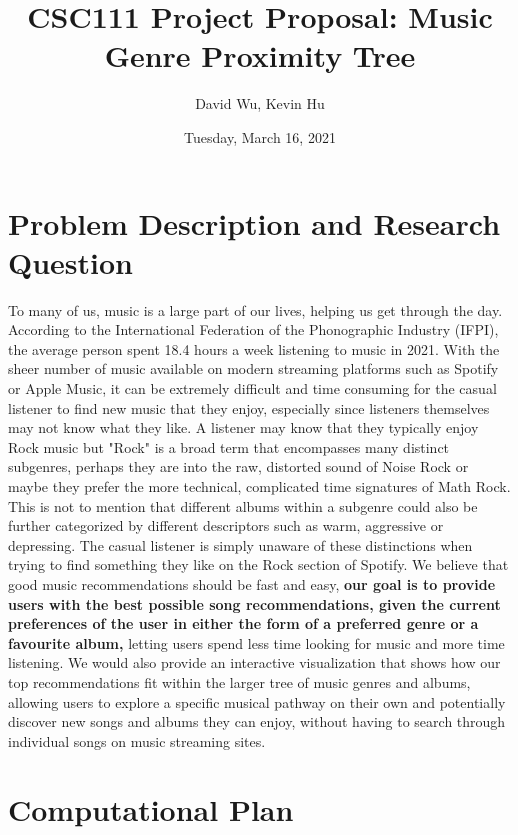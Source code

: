 \documentclass[fontsize=11pt]{article}
\title{CSC111 Project Proposal: Music Genre Proximity Tree}
\author{David Wu, Kevin Hu}
\date{Tuesday, March 16, 2021}
\begin{document}
\maketitle

\section*{Problem Description and Research Question}

To many of us, music is a large part of our lives, helping us get through the day. According to the International Federation of the Phonographic Industry (IFPI), the average person spent 18.4 hours a week listening to music in 2021. With the sheer number of music available on modern streaming platforms such as Spotify or Apple Music, it can be extremely difficult and time consuming for the casual listener to find new music that they enjoy, especially since listeners themselves may not know what they like. A listener may know that they typically enjoy Rock music but "Rock" is a broad term that encompasses many distinct subgenres, perhaps they are into the raw, distorted sound of Noise Rock or maybe they prefer the more technical, complicated time signatures of Math Rock. This is not to mention that different albums within a subgenre could also be further categorized by different descriptors such as warm, aggressive or depressing. The casual listener is simply unaware of these distinctions when trying to find something they like on the Rock section of Spotify. We believe that good music recommendations should be fast and easy, \textbf{our goal is to provide users with the best possible song recommendations, given the current preferences of the user in either the form of a preferred genre or a favourite album,} letting users spend less time looking for music and more time listening. We would also provide an interactive visualization that shows how our top recommendations fit within the larger tree of music genres and albums, allowing users to explore a specific musical pathway on their own and potentially discover new songs and albums they can enjoy, without having to search through individual songs on music streaming sites.

\section*{Computational Plan}
\end{document}
